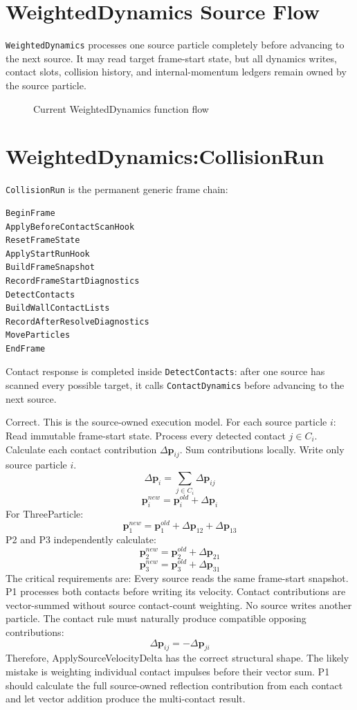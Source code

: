 \newpage
\section{WeightedDynamics Source Flow}

\newcommand{\WeightedFunctionSection}[1]{%
  \section{WeightedDynamics:#1}%
  \label{weighted:#1}%
}

\texttt{WeightedDynamics} processes one source particle completely before
advancing to the next source.  It may read target frame-start state, but all
dynamics writes, contact slots, collision history, and internal-momentum
ledgers remain owned by the source particle.

\begin{figure}[ht]
\centering
\resizebox{\textwidth}{!}{}
\caption{Current WeightedDynamics function flow}
\end{figure}

\clearpage

\WeightedFunctionSection{CollisionRun}

\texttt{CollisionRun} is the permanent generic frame chain:

\begin{verbatim}
BeginFrame
ApplyBeforeContactScanHook
ResetFrameState
ApplyStartRunHook
BuildFrameSnapshot
RecordFrameStartDiagnostics
DetectContacts
BuildWallContactLists
RecordAfterResolveDiagnostics
MoveParticles
EndFrame
\end{verbatim}

Contact response is completed inside \texttt{DetectContacts}: after one source
has scanned every possible target, it calls \texttt{ContactDynamics} before
advancing to the next source.

Correct. This is the source-owned execution model.
For each source particle \(i\):
Read immutable frame-start state.
Process every detected contact \(j \in C_i\).
Calculate each contact contribution \(\Delta\mathbf p_{ij}\).
Sum contributions locally.
Write only source particle \(i\).
\[
\Delta\mathbf p_i
=
\sum_{j\in C_i}\Delta\mathbf p_{ij}
\]\[
\mathbf p_i^{new}
=
\mathbf p_i^{old}+\Delta\mathbf p_i
\]For ThreeParticle:
\[
\mathbf p_1^{new}
=
\mathbf p_1^{old}
+\Delta\mathbf p_{12}
+\Delta\mathbf p_{13}
\]P2 and P3 independently calculate:
\[
\mathbf p_2^{new}
=
\mathbf p_2^{old}+\Delta\mathbf p_{21}
\]\[
\mathbf p_3^{new}
=
\mathbf p_3^{old}+\Delta\mathbf p_{31}
\]The critical requirements are:
Every source reads the same frame-start snapshot.
P1 processes both contacts before writing its velocity.
Contact contributions are vector-summed without source contact-count weighting.
No source writes another particle.
The contact rule must naturally produce compatible opposing contributions:
\[
\Delta\mathbf p_{ij}
=
-\Delta\mathbf p_{ji}
\]Therefore, ApplySourceVelocityDelta has the correct structural shape. The likely mistake is weighting individual contact impulses before their vector sum. P1 should calculate the full source-owned reflection contribution from each contact and let vector addition produce the multi-contact result.

